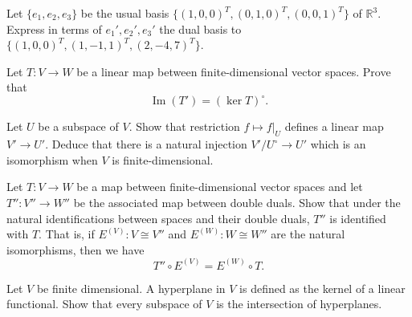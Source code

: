 \documentclass[answers]{exam}
\begin{document}
\begin{questions}
\question%
Let $\{e_{1}, e_{2}, e_{3}\}$ be the usual basis $\{(1,0,0)^{T},(0,1,0)^{T},(0,0,1)^{T}\}$ of $\mathbb{R}^{3}$. Express in terms of $e_{1}', e_{2}', e_{3}'$ the dual basis to $\{(1,0,0)^{T},(1,-1,1)^{T},(2,-4,7)^{T}\}$.



\question%
Let $T: V \to W$ be a linear map between finite-dimensional vector spaces. Prove that \[
	\operatorname{Im}\left(T'\right)=(\ker T)^{\circ}.
\]



\question%
Let $U$ be a subspace of $V$. Show that restriction $f \mapsto f\bigr|_{U}$ defines a linear map $V' \to U'$. Deduce that there is a natural injection $V' / U^{\circ} \to U'$ which is an isomorphism when $V$ is finite-dimensional.



\question%



\question%
Let $T: V \to W$ be a map between finite-dimensional vector spaces and let $T'': V'' \to W''$ be the associated map between double duals. Show that under the natural identifications between spaces and their double duals, $T''$ is identified with $T$. That is, if $E^{(V)}: V \cong V''$ and $E^{(W)}: W \cong W''$ are the natural isomorphisms, then we have \[
	T'' \circ E^{(V)}=E^{(W)} \circ T.
\]



\question%
Let $V$ be finite dimensional. A hyperplane in $V$ is defined as the kernel of a linear functional. Show that every subspace of $V$ is the intersection of hyperplanes.

\end{questions}
\end{document}
